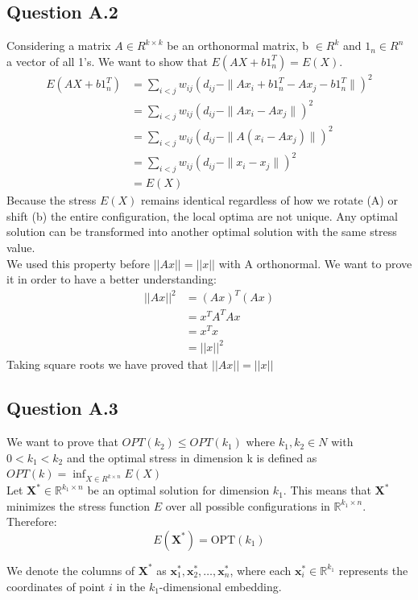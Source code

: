 \documentclass[a4paper]{scrartcl}
\begin{document}
\subsection*{Question A.2}
Considering a matrix $A \in R^{k \times k}$ be an orthonormal matrix, b $\in R^k$ and $1_n \in R^n$ a vector of all 1's. We want to show that $E(AX + b1_n^T) = E(X)$.\\
\begin{align*}
    E(AX + b1_n^T) &= \sum_{i<j} w_{ij} \left(d_{ij} - \|Ax_i + b1_n^T  - Ax_j - b1_n^T\|\right)^2\\
    &= \sum_{i<j} w_{ij} \left(d_{ij} - \|Ax_i  - Ax_j\|\right)^2\\
    &= \sum_{i<j} w_{ij} \left(d_{ij} - \|A(x_i  - Ax_j)\|\right)^2\\
    &= \sum_{i<j} w_{ij} \left(d_{ij} - \|x_i  - x_j\|\right)^2\\
    &= E(X)
\end{align*}
Because the stress $E(X)$ remains identical regardless of how we rotate (A) or shift (b) the entire configuration, the local optima are not unique. Any optimal solution can be transformed into another optimal solution with the same stress value.\\
We used this property before $||Ax|| = ||x||$ with A orthonormal. We want to prove it in order to have a better understanding:
\begin{align*}
||Ax||^2 &= (Ax)^T (Ax)\\
&= x^T A^T A x\\
&= x^T x\\
&= ||x||^2 
\end{align*}
Taking square roots we have proved that $||Ax|| = ||x||$
\subsection*{Question A.3}
We want to prove that $OPT(k_2) \leq OPT(k_1)$ where $k_1, k_2 \in N$ with $0 < k_1 < k_2$ and the optimal stress in dimension k is defined as $OPT(k) = \inf_{X \in R^{k \times n}} E(X)$\\
Let $\mathbf{X}^* \in \mathbb{R}^{k_1 \times n}$ be an optimal solution for dimension $k_1$. This means that $\mathbf{X}^*$ minimizes the stress function $E$ over all possible configurations in $\mathbb{R}^{k_1 \times n}$. Therefore:
$$E(\mathbf{X}^*) = \text{OPT}(k_1)$$

We denote the columns of $\mathbf{X}^*$ as $\mathbf{x}_1^*, \mathbf{x}_2^*, \ldots, \mathbf{x}_n^*$, where each $\mathbf{x}_i^* \in \mathbb{R}^{k_1}$ represents the coordinates of point $i$ in the $k_1$-dimensional embedding.
\end{document}

